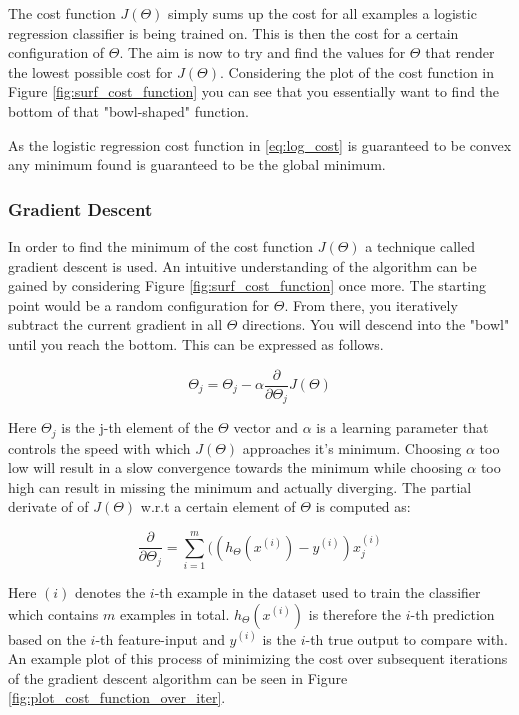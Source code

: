 The cost function $J(\Theta)$ simply sums up the cost for all examples a logistic regression classifier is being trained on. This is then the cost for a certain configuration of $\Theta$. The aim is now to try and find the values for $\Theta$ that render the lowest possible cost for $J(\Theta)$. Considering the plot of the cost function in Figure \ref{fig:surf_cost_function} you can see that you essentially want to find the bottom of that "bowl-shaped" function. 

As the logistic regression cost function in \eqref{eq:log_cost} is guaranteed to be convex  any minimum found is guaranteed to be the global minimum.

\subsubsection{Gradient Descent}

In order to find the minimum of the cost function $J(\Theta)$ a technique called gradient descent is used. An intuitive understanding of the algorithm can be gained by considering Figure \ref{fig:surf_cost_function} once more. The starting point would be a random configuration for $\Theta$. From there, you iteratively subtract the current gradient in all $\Theta$ directions. You will descend into the "bowl" until you reach the bottom. This can be expressed as follows.

\begin{equation}
\Theta_j = \Theta_j - \alpha \frac{\partial}{\partial \Theta_j} J(\Theta)
\end{equation}

Here $\Theta_j$ is the j-th element of the $\Theta$ vector and $\alpha$ is a learning parameter that controls the speed with which $J(\Theta)$ approaches it's minimum. Choosing $\alpha$ too low will result in a slow convergence towards the minimum while choosing $\alpha$ too high can result in missing the minimum and actually diverging. The partial derivate of of $J(\Theta)$ w.r.t a certain element of $\Theta$ is computed as:

\begin{equation}
\frac{\partial}{\partial \Theta_j} = \sum_{i=1}^m((h_\Theta(x^{(i)}) - y^{(i)})x_j^{(i)}
\end{equation}

Here $(i)$ denotes the $i$-th example in the dataset used to train the classifier which contains $m$ examples in total. $h_\Theta(x^{(i)})$ is therefore the $i$-th prediction based on the $i$-th feature-input and $y^{(i)}$ is the $i$-th true output to compare with. An example plot of this process of minimizing the cost over subsequent iterations of the gradient descent algorithm can be seen in Figure \ref{fig:plot_cost_function_over_iter}.

